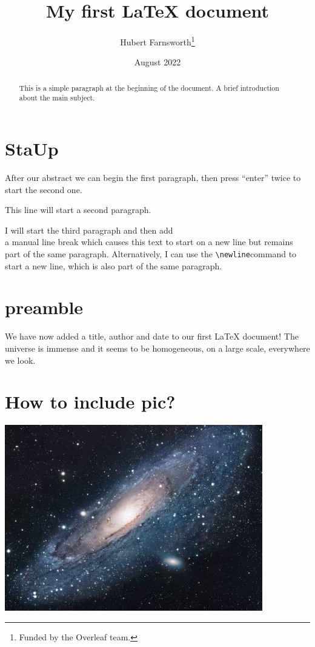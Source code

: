 \documentclass[12pt, letterpaper]{article}
\title{My first LaTeX document}
\author{Hubert Farnsworth\thanks{Funded by the Overleaf team.}}
\date{August 2022}
\begin{document}
\maketitle
\begin{abstract}
This is a simple paragraph at the beginning of the 
document. A brief introduction about the main subject.
\end{abstract}

\section{StaUp}
After our abstract we can begin the first paragraph, then press ``enter'' twice to start the second one.

This line will start a second paragraph.

I will start the third paragraph and then add \\ 
a manual line break which \newline causes this text to start on a new line but remains part of the same paragraph. Alternatively, I can use the \verb|\newline|\newline command to start a new line, which is also part of the same paragraph.


\section{preamble}
We have now added a title, author and date to our first \LaTeX{} document!
The universe is immense and it seems to be homogeneous, 
on a large scale, everywhere we look.\\



\section{How to include pic?}

\includegraphics{universe}
\end{document}
